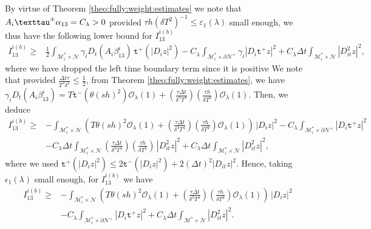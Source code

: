 \documentclass[11pt,oneside,leqno]{amsart}
\numberwithin{equation}{section}
\numberwithin{equation}{section}
\newcommand{\taut}{\text{\texttau}}
\newcommand{\trp}{\mathtt t^+}
\newcommand{\trm}{\mathtt t^-}
\begin{document}
By virtue of Theorem \ref{theo:fully:weight:estimates} we note that $A_{i}\taut^{\pm}\alpha_{13}= C_{\lambda}>0$ provided $\tau h(\delta T^{2})^{-1}\leq \varepsilon_{1}(\lambda)$ small enough, we thus have the following lower bound for $I_{13}^{i(b)}$
\begin{equation*}
\begin{split}
    I_{13}^{i(b)}\geq&\frac{1}{2}\int_{\mathcal{M}^{\ast}_{i}\times\mathcal{N}}\gamma_{i}D_{t}(A_{i}\beta_{13}^{i})\,\trp(|D_{i}z|^{2})-C_{\lambda}\int_{\mathcal{M}^{\ast}_{i}\times\partial\mathcal{N}^{+}}\gamma_{i}|D_{i}\trp z|^{2}+C_{\lambda}\Delta t \int_{\mathcal{M}_{i}^{\ast}\times\mathcal{N}}|D_{it}^{2}z|^{2},
    \end{split}
\end{equation*}
where we have dropped the left time boundary term since it is positive 
We note that provided $\frac{\Delta t \tau}{T^{3}\delta^{2}}\leq \frac{1}{2}$, from Theorem \eqref{theo:fully:weight:estimates}, we have 
$\gamma_{i}D_{t}(A_{i}\beta^{i}_{13})=T\trm(\theta(sh)^{2})\mathcal{O}_{\lambda}(1)+\left( \frac{\tau\Delta t}{\delta^{3}T^{4}}\right)\left( \frac{\tau h}{\delta T^{2}}\right)\mathcal{O}_{\lambda}(1)$. Then, we deduce
\begin{equation*}
\begin{split}
    I_{13}^{i(b)}\geq&-\int_{\mathcal{M}^{\ast}_{i}\times\mathcal{N}}\left( T\theta(sh)^{2}\mathcal{O}_{\lambda}(1)+\left( \frac{\tau\Delta t}{\delta^{3}T^{4}}\right)\left( \frac{\tau h}{\delta T^{2}}\right)\mathcal{O}_{\lambda}(1)\right)\,|D_{i}z|^{2}-C_{\lambda}\int_{\mathcal{M}_{i}^{\ast}\times\partial\mathcal{N}^{+}}|D_{i}\trp z|^{2}\\
    &-C_{\lambda}\Delta t\int_{\mathcal{M}_{i}^{\ast}\times\mathcal{N}}\left( \frac{\tau\Delta t}{\delta^{3}T^{4}}\right)\left( \frac{\tau h}{\delta T^{2}}\right)\,|D_{it}^{2}z|^{2}+C_{\lambda}\Delta t \int_{\mathcal{M}_{i}^{\ast}\times\mathcal{N}}|D_{it}^{2}z|^{2},
    \end{split}
\end{equation*}
 where we used $\trp(|D_{i}z|^{2})\leq 2\trm(|D_{i}z|^{2})+2(\Delta t)^{2}|D_{it}z|^{2}$. Hence, taking $\epsilon_{1}(\lambda)$ small enough, for $I_{13}^{i(b)}$ we have
\begin{equation}\label{eq:I13:a2}
\begin{split}
    I_{13}^{i(b)}\geq&-\int_{\mathcal{M}_{i}^{\ast}\times\mathcal{N}}\left( T\theta(sh)^{2}\mathcal{O}_{\lambda}(1)+\left( \frac{\tau\Delta t}{\delta^{3}T^{4}}\right)\left( \frac{\tau h}{\delta T^{2}}\right)\mathcal{O}_{\lambda}(1)\right)\,|D_{i}z|^{2}\\
    &-C_{\lambda}\int_{\mathcal{M}_{i}^{\ast}\times\partial\mathcal{N}^{+}}|D_{i}\trp z|^{2}+C_{\lambda}\Delta t \int_{\mathcal{M}^{\ast}\times\mathcal{N}}|D_{it}^{2}z|^{2}.
    \end{split}
\end{equation}
\end{document}

